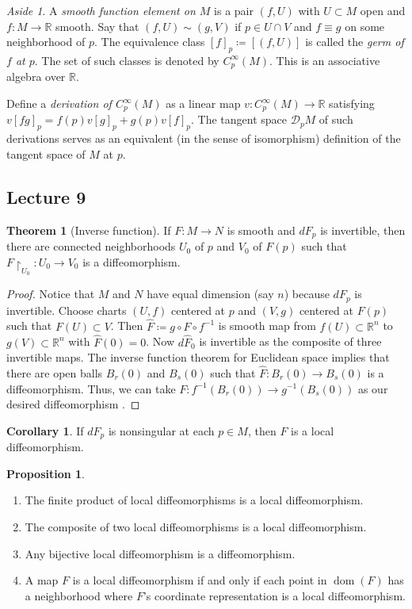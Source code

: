 \documentclass[10pt,letterpaper,cm]{nupset}
\theoremstyle{definition}
\theoremstyle{theorem}
\newtheorem{theorem}[definition]{Theorem}
\newtheorem{prop}[definition]{Proposition}
\newtheorem{corollary}[definition]{Corollary}
\theoremstyle{remark}
\newtheorem*{aside}{Aside}
\newcommand{\R}{\mathbb R}
\newcommand{\1}{\mathbf{1}}
\newcommand{\0}{\vec 0}
\DeclareMathOperator{\dom}{dom}
\begin{document}
\begin{aside}
A \textit{smooth function element on $M$} is a pair $(f, U)$ with $U\subset M$ open and $f: M \to \R$ smooth. Say that $(f, U) \sim (g, V)$ if $p\in U \cap V$ and $f \equiv g$ on some neighborhood of $p$. The equivalence  class $[f]_p \coloneqq \left[(f, U)\right]$ is called the \textit{germ of $f$ at $p$}. The set of such classes is denoted by $C^{\infty}_p(M)$. This is an associative algebra over $\R$. 

 Define a \textit{derivation of $C^{\infty}_p(M)$} as a linear map $v: C^{\infty}_p(M) \to \R$ satisfying $v[fg]_p = f(p)v[g]_p+g(p)v[f]_p$.  The tangent space $\mathcal{D}_pM$ of such derivations serves as an equivalent (in the sense of isomorphism) definition of the tangent space of $M$ at $p$.
\end{aside}

\subsection{Lecture 9}

\begin{theorem}[Inverse function]
If $F: M \to N$ is smooth and $dF_p$ is invertible, then there are connected neighborhoods  $U_0$ of $p$ and $V_0$ of $F(p)$ such that $F\restriction_{U_0}: U_0 \to V_0$ is a diffeomorphism.
\end{theorem}
\begin{proof}
Notice that $M$ and $N$ have equal dimension (say $n$) because $dF_p$ is invertible. Choose charts $(U, f)$ centered at $p$ and $(V, g)$ centered at $F(p)$ such that $F(U) \subset V$. Then $\widehat{F}\coloneqq  g \circ F \circ f^{-1}$ is smooth map from $ f(U)\subset \R^n$ to $ g(V)\subset \R^n$ with $\widehat{F}(0) =0$. Now $d\widehat{F}_0$ is invertible as the composite of three invertible maps. The inverse function theorem for Euclidean space implies that there are open balls $B_{r}(0)$ and $B_s(0)$ such that $\widehat{F} : B_r(0) \to B_s(0)$ is a diffeomorphism. Thus, we can take $F: f^{-1}(B_r(0)) \to g^{-1}(B_s(0))$ as our desired diffeomorphism .
\end{proof}

\begin{corollary}
If $dF_p$ is nonsingular at each $p\in M$, then $F$ is a local diffeomorphism.
\end{corollary}

\begin{prop} $ $
\begin{enumerate}
\item The finite product of local diffeomorphisms is a local diffeomorphism.
\item The composite of two local diffeomorphisms is a local diffeomorphism.
\item Any bijective local diffeomorphism is a diffeomorphism.
\item A map $F$ is a local diffeomorphism if and only if each point in $\dom(F)$ has a neighborhood where $F$'s coordinate representation is a local diffeomorphism.
\end{enumerate}
\end{prop}
\end{document}
